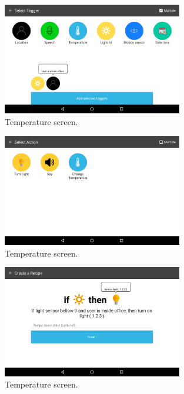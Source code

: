\begin{figure}[h]
\centering
\includegraphics[width=0.7\textwidth]{Figures/screen_trigger}
\caption{Temperature screen.}
\label{screen_triggers}
\end{figure}

\begin{figure}[h]
\centering
\includegraphics[width=0.7\textwidth]{Figures/screen_actions}
\caption{Temperature screen.}
\label{screen_actions}
\end{figure}

\begin{figure}[h]
\centering
\includegraphics[width=0.7\textwidth]{Figures/screen_completed_recipe}
\caption{Temperature screen.}
\label{screen_completed_recipe}
\end{figure}




